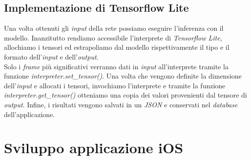 \subsection{Implementazione di Tensorflow Lite}
Una volta ottenuti gli \textit{input} della rete possiamo eseguire l'inferenza con il modello. Inanzitutto rendiamo accessibile l'interprete di \textit{Tensorflow Lite}, allochiamo i tensori ed estrapoliamo dal modello rispettivamente il tipo e il formato dell'\textit{input} e dell'\textit{output}.\\ Solo i \textit{frame} più significativi verranno dati in \textit{input} all'interprete tramite la funzione \textit{interpreter.set\_tensor()}. Una volta che vengono definite la dimensione dell'\textit{input} e allocati i tensori, invochiamo l'interprete e tramite la funzione \textit{interpreter.get\_tensor()} otteniamo una copia dei valori provenienti dal tensore di \textit{output}. Infine, i risultati vengono salvati in un \textit{JSON} e conservati nel \textit{database} dell'applicazione.
\vspace*{2ex}
\section{Sviluppo applicazione iOS}
